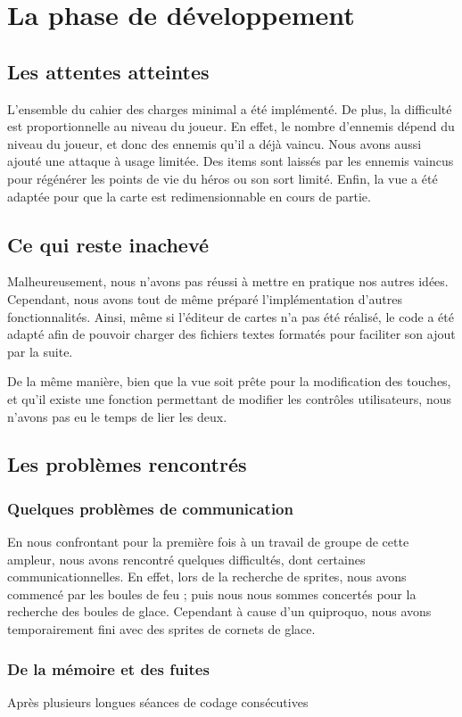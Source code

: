 \section{La phase de développement}

\subsection{Les attentes atteintes}

L'ensemble du cahier des charges minimal a été implémenté. De plus, la difficulté est proportionnelle au niveau du joueur. En effet, le nombre d'ennemis dépend du niveau du joueur, et donc des ennemis qu'il a déjà vaincu. Nous avons aussi ajouté une attaque à usage limitée. Des items sont laissés par les ennemis vaincus pour régénérer les points de vie du héros ou son sort limité. Enfin, la vue a été adaptée pour que la carte est redimensionnable en cours de partie. 

\subsection{Ce qui reste inachevé}

Malheureusement, nous n'avons pas réussi à mettre en pratique nos autres idées. Cependant, nous avons tout de même préparé l'implémentation d'autres fonctionnalités. Ainsi, même si l'éditeur de cartes n'a pas été réalisé, le code a été adapté afin de pouvoir charger des fichiers textes formatés pour faciliter son ajout par la suite. 

De la même manière, bien que la vue soit prête pour la modification des touches, et qu'il existe une fonction permettant de modifier les contrôles utilisateurs, nous n'avons pas eu le temps de lier les deux.

\subsection{Les problèmes rencontrés}

	\subsubsection{Quelques problèmes de communication}
 
En nous confrontant pour la première fois à un travail de groupe de cette ampleur, nous avons rencontré quelques difficultés, dont certaines communicationnelles. En effet, lors de la recherche de sprites, nous avons commencé par les boules de feu ; puis nous nous sommes concertés pour la recherche des boules de glace. Cependant à cause d'un quiproquo, nous avons temporairement fini avec des sprites de cornets de glace. 

	\subsubsection{De la mémoire et des fuites}

Après plusieurs longues séances de codage consécutives

	\subsubsection{}

	\subsubsection{}
